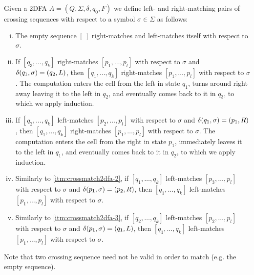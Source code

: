 \begin{defn}
	Given a 2DFA $A=(Q,\Sigma,\delta,q_0,F)$ we define left- and right-matching pairs of crossing sequences with respect to a symbol $\sigma\in\Sigma$ as follows:
	\begin{enumerate}[i.]
		\item The empty sequence $[~]$ right-matches and left-matches itself with respect to $\sigma$.
		\item \label{itm:crossmatch2dfa-2} If $[q_3,\dots,q_k]$ right-matches $[p_1,\dots,p_l]$ with respect to $\sigma$ and $\delta(q_1,\sigma)=(q_2,L)$, then $[q_1,\dots,q_k]$ right-matches $[p_1,\dots,p_l]$ with respect to $\sigma$. The computation enters the cell from the left in state $q_1$, turns around right away leaving it to the left in $q_2$, and eventually comes back to it in $q_3$, to which we apply induction.
		\item \label{itm:crossmatch2dfa-3} If $[q_2,\dots,q_k]$ left-matches $[p_2,\dots,p_l]$ with respect to $\sigma$ and $\delta(q_1,\sigma)=(p_1,R)$, then $[q_1,\dots,q_k]$ right-matches $[p_1,\dots,p_l]$ with respect to $\sigma$. The computation enters the cell from the right in state $p_1$, immediately leaves it to the left in $q_1$, and eventually comes back to it in $q_2$, to which we apply induction.
		\item Similarly to \ref{itm:crossmatch2dfa-2}, if $[q_1,\dots,q_k]$ left-matches $[p_3,\dots,p_l]$ with respect to $\sigma$ and $\delta(p_1,\sigma)=(p_2,R)$, then $[q_1,\dots,q_k]$ left-matches $[p_1,\dots,p_l]$ with respect to $\sigma$.
		\item Similarly to \ref{itm:crossmatch2dfa-3}, if $[q_2,\dots,q_k]$ left-matches $[p_2,\dots,p_l]$ with respect to $\sigma$ and $\delta(p_1,\sigma)=(q_1,L)$, then $[q_1,\dots,q_k]$ left-matches $[p_1,\dots,p_l]$ with respect to $\sigma$.
	\end{enumerate}
\end{defn}
Note that two crossing sequence need not be valid in order to match (e.g. the empty sequence).


